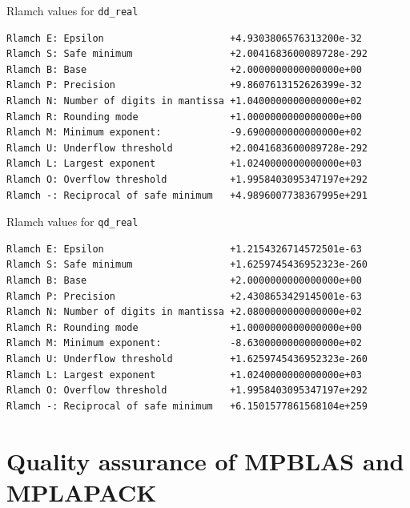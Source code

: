 \documentclass[12pt]{article}
\begin{document}
\begin{table}
\caption{Rlamch values for {\tt dd\_real}}\label{rlamch_dd}
\begin{center}
\begin{verbatim}
Rlamch E: Epsilon                      +4.9303806576313200e-32
Rlamch S: Safe minimum                 +2.0041683600089728e-292
Rlamch B: Base                         +2.0000000000000000e+00
Rlamch P: Precision                    +9.8607613152626399e-32
Rlamch N: Number of digits in mantissa +1.0400000000000000e+02
Rlamch R: Rounding mode                +1.0000000000000000e+00
Rlamch M: Minimum exponent:            -9.6900000000000000e+02
Rlamch U: Underflow threshold          +2.0041683600089728e-292
Rlamch L: Largest exponent             +1.0240000000000000e+03
Rlamch O: Overflow threshold           +1.9958403095347197e+292
Rlamch -: Reciprocal of safe minimum   +4.9896007738367995e+291
\end{verbatim}
\end{center}
\end{table}

\begin{table}
\caption{Rlamch values for {\tt qd\_real}}\label{rlamch_qd}
\begin{center}
\begin{verbatim}
Rlamch E: Epsilon                      +1.2154326714572501e-63
Rlamch S: Safe minimum                 +1.6259745436952323e-260
Rlamch B: Base                         +2.0000000000000000e+00
Rlamch P: Precision                    +2.4308653429145001e-63
Rlamch N: Number of digits in mantissa +2.0800000000000000e+02
Rlamch R: Rounding mode                +1.0000000000000000e+00
Rlamch M: Minimum exponent:            -8.6300000000000000e+02
Rlamch U: Underflow threshold          +1.6259745436952323e-260
Rlamch L: Largest exponent             +1.0240000000000000e+03
Rlamch O: Overflow threshold           +1.9958403095347197e+292
Rlamch -: Reciprocal of safe minimum   +6.1501577861568104e+259
\end{verbatim}
\end{center}
\end{table}

\section{Quality assurance of MPBLAS and MPLAPACK}
\label{sec:howtotest}
\end{document}
